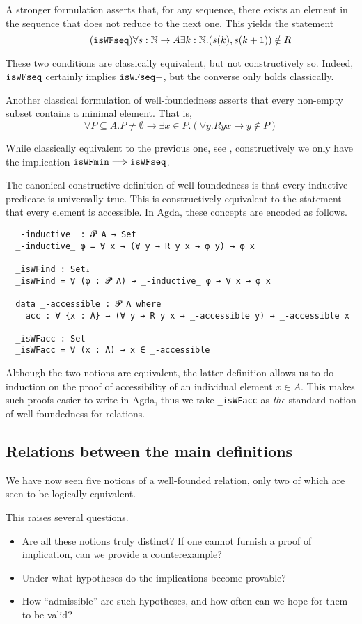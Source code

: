 A stronger formulation asserts that, for any sequence, there exists an element
in the sequence that does not reduce to the next one.  This yields the statement
\[\tag{$\isWFseq$} \forall s : \nat \to A \exists k : \nat. (s(k),s(k+1)) \notin R \]

These two conditions are classically equivalent, but not constructively so.
Indeed, $\mathtt{isWFseq}$ certainly implies $\mathtt{isWFseq-}$, but the converse only holds classically.

Another classical formulation of well-foundedness
asserts that every non-empty subset
contains a minimal element.  That is,
\[ \tag{$\isWFmin$} \forall P \subseteq A. P \neq \emptyset \to \exists x \in P. (\forall y. Ryx \to y\notin P) \]

While classically equivalent to the previous one, see \cite[Exercise A.1.8]{Terese},
constructively we only have the implication $\mathtt{isWFmin} \Longrightarrow \mathtt{isWFseq}$.

The canonical constructive definition of well-foundedness is that
every inductive predicate is universally true.
This is constructively equivalent to the statement that every element
is accessible.  In Agda, these concepts are encoded as follows.
{\small
\begin{verbatim}
  _-inductive_ : 𝓟 A → Set
  _-inductive_ φ = ∀ x → (∀ y → R y x → φ y) → φ x

  _isWFind : Set₁
  _isWFind = ∀ (φ : 𝓟 A) → _-inductive_ φ → ∀ x → φ x

  data _-accessible : 𝓟 A where
    acc : ∀ {x : A} → (∀ y → R y x → _-accessible y) → _-accessible x

  _isWFacc : Set
  _isWFacc = ∀ (x : A) → x ∈ _-accessible
\end{verbatim}
}
Although the two notions are equivalent, the latter definition allows us to do induction on the proof of accessibility of an individual element $x \in A$.  This makes such proofs easier to write in Agda, thus we take
\verb|_isWFacc| as \emph{the} standard notion of well-foundedness for relations.

\subsection{Relations between the main definitions}

We have now seen five notions of a well-founded relation, only two of which
are seen to be logically equivalent.

This raises several questions.
\begin{itemize}
\item Are all these notions truly distinct?  If one cannot furnish a proof of implication,
can we provide a counterexample?
\item Under what hypotheses do the implications become provable?
\item How ``admissible'' are such hypotheses, and how often can we hope for them to be valid?
\end{itemize}


